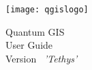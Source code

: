 
\begin{titlepage}
\begin{center}

\begin{center}
\texttt{[image: qgislogo]} 
\end{center}

\Huge{Quantum GIS}\\
\vspace{0.5cm}
\Large{User Guide} \\
\vspace{0.5cm}
\Large{Version ~\CURRENT \textsl{'Tethys'}}

\end{center}
\end{titlepage}
